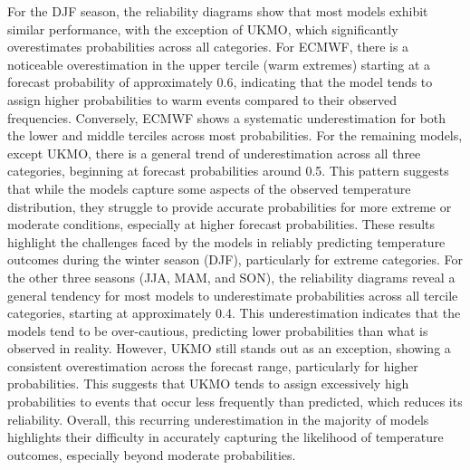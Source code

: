 For the DJF season, the reliability diagrams show that most models exhibit similar performance, with the exception of UKMO, which significantly overestimates probabilities across all categories. For ECMWF, there is a noticeable overestimation in the upper tercile (warm extremes) starting at a forecast probability of approximately 0.6, indicating that the model tends to assign higher probabilities to warm events compared to their observed frequencies. Conversely, ECMWF shows a systematic underestimation for both the lower and middle terciles across most probabilities. For the remaining models, except UKMO, there is a general trend of underestimation across all three categories, beginning at forecast probabilities around 0.5. This pattern suggests that while the models capture some aspects of the observed temperature distribution, they struggle to provide accurate probabilities for more extreme or moderate conditions, especially at higher forecast probabilities. These results highlight the challenges faced by the models in reliably predicting temperature outcomes during the winter season (DJF), particularly for extreme categories.
For the other three seasons (JJA, MAM, and SON), the reliability diagrams reveal a general tendency for most models to underestimate probabilities across all tercile categories, starting at approximately 0.4. This underestimation indicates that the models tend to be over-cautious, predicting lower probabilities than what is observed in reality. However, UKMO still stands out as an exception, showing a consistent overestimation across the forecast range, particularly for higher probabilities. This suggests that UKMO tends to assign excessively high probabilities to events that occur less frequently than predicted, which reduces its reliability. Overall, this recurring underestimation in the majority of models highlights their difficulty in accurately capturing the likelihood of temperature outcomes, especially beyond moderate probabilities. 

